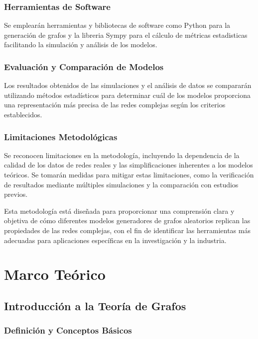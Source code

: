 \documentclass[12pt]{book}
\begin{document}
\subsection{Herramientas de Software}

Se emplearán herramientas y bibliotecas de software como Python para la generación de grafos y la libreria Sympy para el cálculo de métricas estadisticas facilitando la simulación y análisis de los modelos.

\subsection{Evaluación y Comparación de Modelos}

Los resultados obtenidos de las simulaciones y el análisis de datos se compararán utilizando métodos estadísticos para determinar cuál de los modelos proporciona una representación más precisa de las redes complejas según los criterios establecidos.

\subsection{Limitaciones Metodológicas}

Se reconocen limitaciones en la metodología, incluyendo la dependencia de la calidad de los datos de redes reales y las simplificaciones inherentes a los modelos teóricos. Se tomarán medidas para mitigar estas limitaciones, como la verificación de resultados mediante múltiples simulaciones y la comparación con estudios previos.

Esta metodología está diseñada para proporcionar una comprensión clara y objetiva de cómo diferentes modelos generadores de grafos aleatorios replican las propiedades de las redes complejas, con el fin de identificar las herramientas más adecuadas para aplicaciones específicas en la investigación y la industria.

\chapter{Marco Teórico}

\section{Introducción a la Teoría de Grafos}
\subsection{Definición y Conceptos Básicos}
\end{document}
